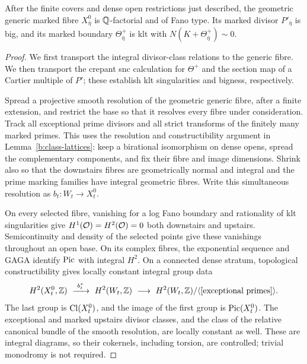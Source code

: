 \begin{lemma}
\label{b:generic-marked-fano}
After the finite covers and dense open restrictions just described, the
geometric generic marked fibre \(X^0_{\bar\eta}\) is
\(\mathbb Q\)-factorial and of Fano type. Its marked divisor \(P'_{\bar\eta}\)
is big, and its marked boundary \(\Theta^+_{\bar\eta}\) is klt with
\(N(K+\Theta^+_{\bar\eta})\sim0\).
\end{lemma}

\begin{proof}
We first transport the integral divisor-class relations to the generic
fibre. We then transport the crepant snc calculation for
\(\Theta^+\) and the section map of a Cartier multiple of \(P'\);
these establish klt singularities and bigness, respectively.

Spread a projective smooth resolution of the geometric generic fibre,
after a finite extension, and restrict the base so that it resolves every
fibre under consideration. Track all exceptional prime divisors and all
strict transforms of the finitely many marked primes. This uses the
resolution and constructibility argument in
Lemma~\ref{b:class-lattices}: keep a birational isomorphism on dense opens,
spread the complementary components, and fix their fibre and image
dimensions. Shrink also so that the downstairs fibres are geometrically
normal and integral and the prime marking families have integral
geometric fibres. Write this simultaneous resolution as
\(b_t:W_t\to X^0_t\).

On every selected fibre, vanishing for a log Fano boundary
\cite[Theorem~3.2]{FujinoFundamental} and rationality of klt
singularities \cite[Theorem~0.1]{FujinoRational} give
\(H^1(\mathcal O)=H^2(\mathcal O)=0\) both downstairs and upstairs. Semicontinuity and
density of the selected points give these vanishings throughout an open
base. On its complex fibres, the exponential sequence and GAGA
\cite[Section~12, Theorems~1--3; Section~20, Proposition~18]{SerreGAGA}
identify \(\operatorname{Pic}\) with integral \(H^2\). On a connected dense stratum, topological
constructibility gives locally constant integral group data
\[
 H^2(X^0_t,\Z)\ \xrightarrow{\ b_t^*\ }\ H^2(W_t,\Z)
 \ \longrightarrow\ H^2(W_t,\Z)/
      \langle[\text{exceptional primes}]\rangle.
\]
The last group is \(\operatorname{Cl}(X^0_t)\), and the image of the first group is
\(\operatorname{Pic}(X^0_t)\). The exceptional and marked upstairs divisor classes,
and the class of the relative canonical bundle of the smooth resolution,
are locally constant as well. These are integral diagrams, so their
cokernels, including torsion, are controlled; trivial monodromy is not
required.


\end{proof}
